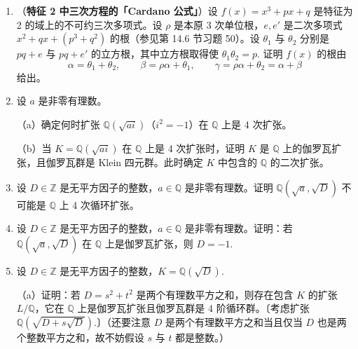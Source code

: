 \begin{enumerate}
〔论证与三次方程的情形类似。设 \(L \subseteq \mathbb{R}\) 是 \(\mathbb{Q}(a)\) 的伽罗瓦闭包，并假设 \(\operatorname{Gal}(L/\mathbb{Q})\) 的阶被某个奇素数 \(p\) 整除。由习题 12，存在 \(L\) 的子域 \(F\) 使 \([L:F] = p\) 且 \(L = F(a)\). 考虑合成域 \(K'_i = FK_i\)（\(i = 0, 1, \ldots, m\)）。它们仍是实根式扩张，且由正文中关于 casus irreducibilis 的论证，可以假设每个 \([K'_{i+1}:K'_i]\) 都是素数。由于 \(a \notin F = FK_0\)，存在整数 \(i\) 使 \(a \notin K'_{i-1}\) 而 \(a \in K'_i\). 由于这些扩张都是素数次的，有 \(K'_i = K'_{i-1}(a)\). 由于 \(L = F(a)\) 是 \(p\) 次伽罗瓦扩张，\(K'_i\) 是 \(K'_{i-1}\) 的 \(p\) 次伽罗瓦扩张，与上一习题矛盾。〕

\item （\textbf{特征 2 中三次方程的「Cardano 公式」}）设 \(f(x) = x^3+px+q\) 是特征为 2 的域上的不可约三次多项式。设 \(\rho\) 是本原 3 次单位根，\(e, e'\) 是二次多项式 \(x^2+qx+(p^3+q^2)\) 的根（参见第 14.6 节习题 50）。设 \(\theta_1\) 与 \(\theta_2\) 分别是 \(pq+e\) 与 \(pq+e'\) 的立方根，其中立方根取得使 \(\theta_1\theta_2 = p\). 证明 \(f(x)\) 的根由
\[
\alpha = \theta_1+\theta_2, \qquad \beta = \rho\alpha+\theta_1, \qquad \gamma = \rho\alpha+\theta_2 = \alpha+\beta
\]
给出。

\item 设 \(a\) 是非零有理数。

（a）确定何时扩张 \(\mathbb{Q}(\sqrt{ai})\)（\(i^2 = -1\)）在 \(\mathbb{Q}\) 上是 4 次扩张。

（b）当 \(K = \mathbb{Q}(\sqrt{ai})\) 在 \(\mathbb{Q}\) 上是 4 次扩张时，证明 \(K\) 是 \(\mathbb{Q}\) 上的伽罗瓦扩张，且伽罗瓦群是 Klein 四元群。此时确定 \(K\) 中包含的 \(\mathbb{Q}\) 的二次扩张。

\item 设 \(D \in \mathbb{Z}\) 是无平方因子的整数，\(a \in \mathbb{Q}\) 是非零有理数。证明 \(\mathbb{Q}(\sqrt{a}, \sqrt{D})\) 不可能是 \(\mathbb{Q}\) 上 4 次循环扩张。

\item 设 \(D \in \mathbb{Z}\) 是无平方因子的整数，\(a \in \mathbb{Q}\) 是非零有理数。证明：若 \(\mathbb{Q}(\sqrt{a}, \sqrt{D})\) 在 \(\mathbb{Q}\) 上是伽罗瓦扩张，则 \(D = -1\).

\item 设 \(D \in \mathbb{Z}\) 是无平方因子的整数，\(K = \mathbb{Q}(\sqrt{D})\).

（a）证明：若 \(D = s^2+t^2\) 是两个有理数平方之和，则存在包含 \(K\) 的扩张 \(L/\mathbb{Q}\)，它在 \(\mathbb{Q}\) 上是伽罗瓦扩张且伽罗瓦群是 4 阶循环群。〔考虑扩张 \(\mathbb{Q}(\sqrt{D+s\sqrt{D}})\).〕（还要注意 \(D\) 是两个有理数平方之和当且仅当 \(D\) 也是两个整数平方之和，故不妨假设 \(s\) 与 \(t\) 都是整数。）


\end{enumerate}
